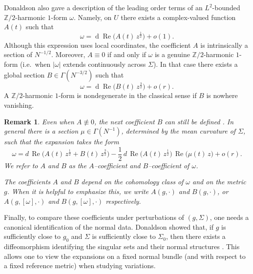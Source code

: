\documentclass[11pt]{amsart}
\newcommand{\ZT}{\mathbb{Z}/2}
\renewcommand{\d}{\operatorname{d}}
\renewcommand{\Re}{\operatorname{Re}}
\newtheorem{remark}[theorem]{Remark}
\begin{document}
Donaldson \cite{Donaldson2021} also gave a description of the leading order terms of an $L^2$-bounded
$\ZT$-harmonic $1$-form $\omega$. Namely, on $U$ there exists a complex-valued function $A(t)$ such that
\[
\omega = \d\Re\bigl(A(t)\, z^{\frac12}\bigr) + o(1).
\]
Although this expression uses local coordinates, the coefficient $A$ is intrinsically a section of
$N^{-1/2}$. Moreover, $A\equiv 0$ if and only if $\omega$ is a genuine $\ZT$-harmonic $1$-form (i.e.\ when $|\omega|$ extends
continuously across $\Sigma$). In that case there exists a global section
$B\in \Gamma(N^{-3/2})$ such that
\[
\omega = \d\Re\bigl(B(t)\, z^{\frac32}\bigr) + o(r).
\]
A $\ZT$-harmonic $1$-form is nondegenerate in the classical sense if $B$ is nowhere vanishing.

\begin{remark}
Even when $A\not\equiv 0$, the next coefficient $B$ can still be defined \cite{Donaldson2021}.
In general there is a section $\mu\in\Gamma(N^{-1})$, determined by the mean curvature of $\Sigma$,
such that the expansion takes the form
\begin{equation}
	\label{eq:the-actual-expansion}
	\omega
	= d\,\Re\!\bigl(A(t)\,z^{\frac12}+B(t)\,z^{\frac32}\bigr)
	-\frac12\, d\,\Re\!\bigl(A(t)\,z^{\frac12}\bigr)\,\Re\!\bigl(\mu(t)\,z\bigr)
	+ o(r).
\end{equation}
We refer to $A$ and $B$ as the \emph{$A$--coefficient} and \emph{$B$--coefficient} of $\omega$.	

The coefficients $A$ and $B$ depend on the cohomology class of $\omega$ and on the metric $g$.
When it is helpful to emphasize this, we write $A(g,\cdot)$ and $B(g,\cdot)$, or
$A(g,[\omega],\cdot)$ and $B(g,[\omega],\cdot)$ respectively.
\end{remark}


Finally, to compare these coefficients under perturbations of $(g,\Sigma)$, one needs a
canonical identification of the normal data. Donaldson showed that, if $g$ is sufficiently close
to $g_0$ and $\Sigma$ is sufficiently close to $\Sigma_0$, then there exists a diffeomorphism
identifying the singular sets and their normal structures \cite[Proposition~4.2]{Donaldson2021}.
This allows one to view the expansions on a fixed normal bundle (and with respect to a fixed
reference metric) when studying variations.
\end{document}
